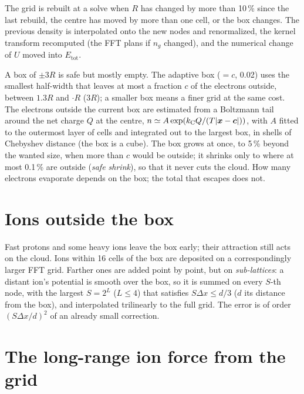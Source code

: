 The grid is rebuilt at a solve when $R$ has changed by more than 10\,\% since the last rebuild, the centre has moved by
more than one cell, or the box changes.
The previous density is interpolated onto the new nodes and renormalized, the kernel transform recomputed (the FFT
plans if $n_g$ changed), and the numerical change of $U$ moved into $E_{\mathrm{tot}}$.

A box of $\pm3R$ is safe but mostly empty.
The adaptive box ($=c$, 0.02) uses the smallest half-width that leaves at most a fraction $c$
of the electrons outside, between $1.3R$ and $\cdot R$ ($3R$); a smaller box means a finer grid
at the same cost.
The electrons outside the current box are estimated from a Boltzmann tail around the net charge $Q$ at the centre,
$n\simeq A\exp(k_{\mathrm C} Q/(T|\bm{x}-\bm{c}|))$, with $A$ fitted to the outermost layer of cells and integrated out to the
largest box, in shells of Chebyshev distance (the box is a cube).
The box grows at once, to 5\,\% beyond the wanted size, when more than $c$ would be outside; it shrinks only to where
at most 0.1\,\% are outside (\emph{safe shrink}), so that it never cuts the cloud.
How many electrons evaporate depends on the box; the total that escapes does not.

\section{Ions outside the box}

Fast protons and some heavy ions leave the box early; their attraction still acts on the cloud.
Ions within 16 cells of the box are deposited on a correspondingly larger FFT grid.
Farther ones are added point by point, but on \emph{sub-lattices}: a distant ion's potential is smooth over the box, so
it is summed on every $S$-th node, with the largest $S = 2^L$ ($L\le4$) that satisfies $S\Delta x\le d/3$ ($d$ its
distance from the box), and interpolated trilinearly to the full grid.
The error is of order $(S\Delta x/d)^2$ of an already small correction.

\section{The long-range ion force from the grid}
\label{sec:longrange}

